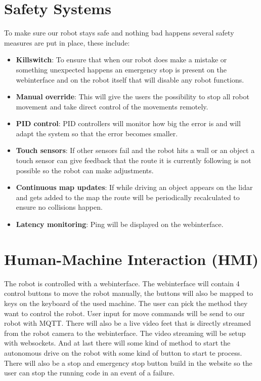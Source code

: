 \documentclass[a4paper]{article}
\begin{document}
\section*{Safety Systems}
To make sure our robot stays safe and nothing bad happens several safety measures are put in place, these include:
\begin{itemize}
    \item \textbf{Killswitch}: To ensure that when our robot does make a mistake or something unexpected happens an emergency stop is present on the webinterface and on the robot itself that will disable any robot functions.
    \item \textbf{Manual override}: This will give the users the possibility to stop all robot movement and take direct control of the movements remotely.
    \item \textbf{PID control}: PID controllers will monitor how big the error is and will adapt the system so that the error becomes smaller.
    \item \textbf{Touch sensors}: If other sensors fail and the robot hits a wall or an object a touch sensor can give feedback that the route it is currently following is not possible so the robot can make adjustments.
    \item \textbf{Continuous map updates}: If while driving an object appears on the lidar and gets added to the map the route will be periodically recalculated to ensure no collisions happen.
    \item \textbf{Latency monitoring}: Ping will be displayed on the webinterface.
\end{itemize}


\section*{Human-Machine Interaction (HMI)}
The robot is controlled with a webinterface. The webinterface will contain 4 control buttons to move the robot manually, the buttons will also be mapped to keys on the keyboard of the used machine. The user can pick the method they want to control the robot. User input for move commands will be send to our robot with MQTT.  There will also be a live video feet that is directly streamed from the robot camera to the webinterface. The video streaming will be setup with websockets. And at last there will some kind of method to start the autonomous drive on the robot with some kind of button to start te process. There will also be a stop and emergency stop button build in the website so the user can stop the running code in an event of a failure.
\end{document}
